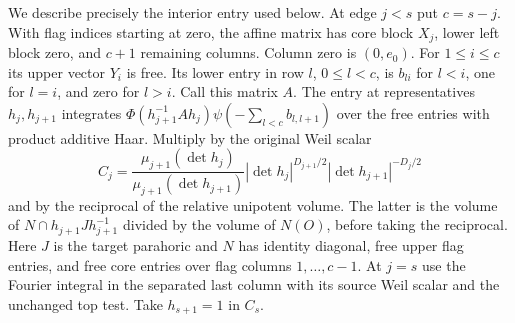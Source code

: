 \documentclass[a4paper,11pt]{article}
\theoremstyle{definition}
\theoremstyle{remark}
\numberwithin{equation}{section}
\begin{document}
We describe precisely the interior entry used below. At
edge \(j<s\) put \(c=s-j\). With flag indices starting at
zero, the affine matrix has core block \(X_j\), lower left
block zero, and \(c+1\) remaining columns. Column zero is
\((0,e_0)\). For \(1\le i\le c\) its upper vector \(Y_i\)
is free. Its lower entry in row \(l\), \(0\le l<c\), is
\(b_{li}\) for \(l<i\), one for \(l=i\), and zero for \(l>i\).
Call this matrix \(A\). The entry at representatives
\(h_j,h_{j+1}\) integrates
\(\Phi(h_{j+1}^{-1}Ah_j)\psi(-\sum_{l<c}b_{l,l+1})\)
over the free entries with product additive Haar. Multiply
by the original Weil scalar
\[
 C_j=\frac{\mu_{j+1}(\det h_j)}{\mu_{j+1}(\det h_{j+1})}
       |\det h_j|^{D_{j+1}/2}|\det h_{j+1}|^{-D_j/2}
\]
and by the reciprocal of the relative unipotent volume.
The latter is the volume of \(N\cap h_{j+1}J h_{j+1}^{-1}\)
divided by the volume of \(N(O)\), before taking the
reciprocal. Here \(J\) is the target parahoric and \(N\)
has identity diagonal, free upper flag entries, and free
core entries over flag columns \(1,\ldots,c-1\).
At \(j=s\) use the Fourier integral in the separated last
column with its source Weil scalar and the unchanged top test.
Take \(h_{s+1}=1\) in \(C_s\).
\end{document}
